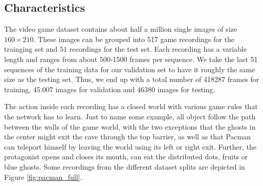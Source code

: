 \subsection{Characteristics}

The video game dataset contains about half a million single images of size $ 160 \times 210 $. These images can be grouped into \num{517} game recordings for the trainging set and $51$ recordings for the test set. Each recording has a variable length and ranges from about \num{500}-\num{1500} frames per sequence. We take the last \num{51} sequences of the training data for our validation set to have it roughly the same size as the testing set. Thus, we end up with a total number of \num{418287} frames for training, \num{45,007} images for validation and \num{46380} images for testing.

The action inside each recording has a closed world with various game rules that the network has to learn. Just to name some example, all object follow the path between the walls of the game world, with the two exceptions that the ghosts in the center might exit the cave through the top barrier, as well as that Pacman can teleport himself by leaving the world using its left or right exit. Further, the protagonist opens and closes its mouth, can eat the distributed dots, fruits or blue ghosts. Some recordings from the different dataset splits are depicted in Figure \ref{fig:pacman_full}.


